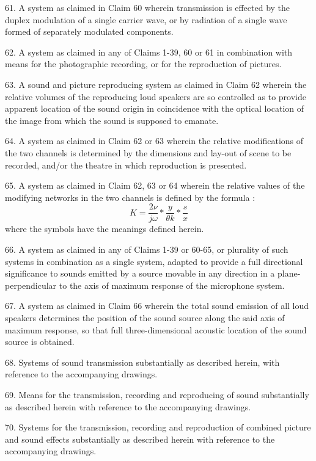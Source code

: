 \documentclass[11pt]{article}
\begin{document}
\begin{multicols*}{2}
61. A system as claimed in Claim 60 wherein transmission is effected by the duplex modulation of a single carrier wave, or by radiation of a single wave formed of separately modulated components.

62. A system as claimed in any of Claims 1-39, 60 or 61 in combination with means for the photographic recording, or for the reproduction of pictures. 

63. A sound and picture reproducing system as claimed in Claim 62 wherein the relative volumes of the reproducing loud speakers are so controlled as to provide apparent location of the sound origin in coincidence with the optical location of the image from which the sound is supposed to emanate.

64. A system as claimed in Claim 62 or 63 wherein the relative modifications of the two channels is determined by the dimensions and lay-out of scene to be recorded, and/or the theatre in which reproduction is presented.



65. A system as claimed in Claim 62, 63 or 64 wherein the relative values of the modifying networks in the two channels is defined by the formula :
\[
K = \frac{2\nu}{j\omega} * \frac{y}{\theta k} * \frac{s}{x}
\]
where the symbols have the meanings defined herein. 

66. A system as claimed in any of Claims 1-39 or 60-65, or plurality of such systems in combination as a single system, adapted to provide a full directional significance to sounds emitted by a source movable in any direction in a plane-perpendicular to the axis of maximum response of the microphone system.

67. A system as claimed in Claim 66 wherein the total sound emission of all loud speakers determines the position of the sound source along the said axis of maximum response, so that full three-dimensional acoustic location of the sound source is obtained. 

68. Systems of sound transmission substantially as described herein, with reference to the accompanying drawings. 

69. Means for the transmission, recording and reproducing of sound substantially as described herein with reference to the accompanying drawings. 

70. Systems for the transmission, recording and reproduction of combined picture and sound effects substantially as described herein with reference to the accompanying drawings. 

\begin{flushright}


\end{flushright}
\end{multicols*}
\end{document}
